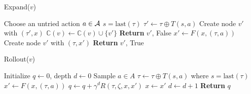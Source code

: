 \begin{minipage}{0.45\textwidth}
    \begin{algorithm}[H]
        \captionsetup{labelformat=default,labelsep=colon,name=Procedure}
        \caption{\sc Expand($v$)}
        \label{algo:expand}
            \begin{algorithmic}[1]
            \STATE Choose an untried action $a\in \mathcal{A}$
                \STATE $s=\mathrm{last}(\tau)$
                \STATE $\tau'\gets \tau\oplus T(s,a)$
                \STATE Create node $v'$ with $(\tau', x)$
                \STATE $\mathbb{C}(v) \gets \mathbb{C}(v) \cup \{v'\}$
                \STATE \textbf{Return} $v'$, False
                \STATE $x'\gets F(x, (\tau,a))$
                \STATE Create node $v'$ with $(\tau, x')$
                \STATE \textbf{Return} $v'$, True
            \ENDIF
            \end{algorithmic}
    \end{algorithm}
\end{minipage}
\begin{minipage}{0.45\textwidth}
    \begin{algorithm}[H]
        \captionsetup{labelformat=default,labelsep=colon,name=Procedure}
        \caption{\sc Rollout($v$)}
        \label{algo:rollout}
        \begin{algorithmic}[1]
            \STATE Initialize $q \gets 0$, depth $d \gets 0$
                \STATE Sample $a \in A$
                    \STATE $\tau\gets \tau\oplus T(s,a)$ where $s=\mathrm{last}(\tau)$
                    \STATE $x'\gets F(x, (\tau,a))$
                \ENDIF
                \STATE $q \gets q + \gamma^d R(\tau, \zeta, x, x')$
                \STATE $x\gets x'$
                \STATE $d \gets d + 1$
            \ENDWHILE
            \STATE \textbf{Return} $q$
        \end{algorithmic}
    \end{algorithm}
\end{minipage}
\hfill

